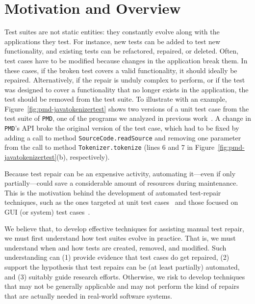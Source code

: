 \documentclass[conference]{IEEEtran}
\newcommand{\lang}[1]{\texttt{\small #1}}
\newcommand{\subject}[1]{\texttt{\small #1}}
\begin{document}



\section{Motivation and Overview}
\label{sec:intro}

Test suites are not static entities: they constantly evolve along with
the applications they test. For instance, new tests can be added to
test new functionality, and existing tests can be refactored,
repaired, or deleted. Often, test cases have to be modified because
changes in the application break them. In these cases, if the broken
test covers a valid functionality, it should ideally be repaired.
Alternatively, if the repair is unduly complex to perform, or if the
test was designed to cover a functionality that no longer exists in
the application, the test should be removed from the test suite. To
illustrate with an example, Figure~\ref{fig:pmd-javatokenizertest}
shows two versions of a unit test case from the test suite of
\subject{PMD}, one of the programs we analyzed in previous
work~\cite{pinto12}.  A change in \subject{PMD}'s API broke the
original version of the test case, which had to be fixed by adding a
call to method \lang{SourceCode.readSource} and removing one parameter
from the call to method \lang{Tokenizer.tokenize} (lines 6 and 7 in
Figure~\ref{fig:pmd-javatokenizertest}(b), respectively).

Because test repair can be an expensive activity, automating it---even
if only partially---could save a considerable amount of resources
during maintenance. This is the motivation behind the development of
automated test-repair techniques, such as the ones targeted at unit
test cases~\cite{Daniel:2009, Daniel:2010, Mirzaaghaei:2012} and those
focused on GUI (or system) test cases~\cite{Choudhary:2011,
  Grechanik:2009, Huang:2010, Memon:2008}.

We believe that, to develop effective techniques for assisting manual
test repair, we must first understand how test suites evolve in
practice.  That is, we must understand when and how tests are created,
removed, and modified. Such understanding can (1) provide evidence
that test cases do get repaired, (2) support the hypothesis that test
repairs can be (at least partially) automated, and (3) suitably guide
research efforts.  Otherwise, we risk to develop techniques that may
not be generally applicable and may not perform the kind of repairs
that are actually needed in real-world software systems.
\end{document}
